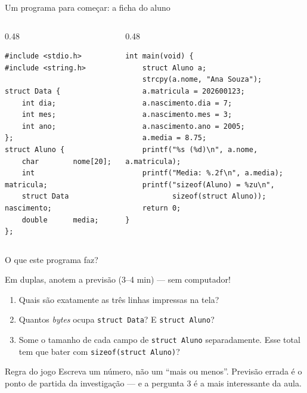 \documentclass[aspectratio=169]{beamer}
\begin{document}
\begin{frame}[fragile]{Um programa para começar: a ficha do aluno}
\begin{columns}[T]
\begin{column}{0.48\textwidth}
\begin{lstlisting}[basicstyle=\ttfamily\scriptsize]
#include <stdio.h>
#include <string.h>

struct Data {
    int dia;
    int mes;
    int ano;
};
struct Aluno {
    char        nome[20];
    int         matricula;
    struct Data nascimento;
    double      media;
};
\end{lstlisting}
\end{column}
\begin{column}{0.48\textwidth}
\begin{lstlisting}[basicstyle=\ttfamily\scriptsize, firstnumber=15]
int main(void) {
    struct Aluno a;
    strcpy(a.nome, "Ana Souza");
    a.matricula = 202600123;
    a.nascimento.dia = 7;
    a.nascimento.mes = 3;
    a.nascimento.ano = 2005;
    a.media = 8.75;
    printf("%s (%d)\n", a.nome, a.matricula);
    printf("Media: %.2f\n", a.media);
    printf("sizeof(Aluno) = %zu\n",
           sizeof(struct Aluno));
    return 0;
}
\end{lstlisting}
\end{column}
\end{columns}
\end{frame}

\begin{frame}{O que este programa faz?}
  \begin{block}{Em duplas, anotem a previsão (3--4 min) --- sem computador!}
    \begin{enumerate}
      \item Quais são exatamente as três linhas impressas na tela?
      \item Quantos \emph{bytes} ocupa \texttt{struct Data}? E \texttt{struct Aluno}?
      \item Some o tamanho de cada campo de \texttt{struct Aluno} separadamente.
        Esse total tem que bater com \texttt{sizeof(struct Aluno)}?
    \end{enumerate}
  \end{block}
  \begin{exampleblock}{Regra do jogo}
    Escreva um número, não um ``mais ou menos''. Previsão errada é o ponto de
    partida da investigação --- e a pergunta 3 é a mais interessante da aula.
  \end{exampleblock}
\end{frame}
\end{document}

